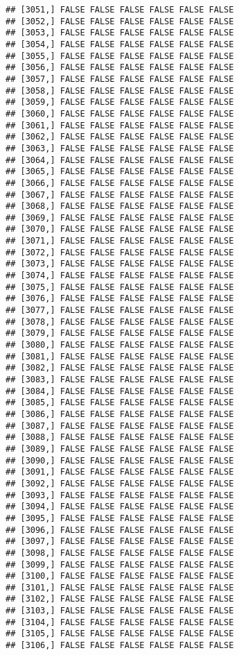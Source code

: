 \documentclass[
]{article}
\begin{document}
\begin{verbatim}
## [3051,] FALSE FALSE FALSE FALSE FALSE FALSE
## [3052,] FALSE FALSE FALSE FALSE FALSE FALSE
## [3053,] FALSE FALSE FALSE FALSE FALSE FALSE
## [3054,] FALSE FALSE FALSE FALSE FALSE FALSE
## [3055,] FALSE FALSE FALSE FALSE FALSE FALSE
## [3056,] FALSE FALSE FALSE FALSE FALSE FALSE
## [3057,] FALSE FALSE FALSE FALSE FALSE FALSE
## [3058,] FALSE FALSE FALSE FALSE FALSE FALSE
## [3059,] FALSE FALSE FALSE FALSE FALSE FALSE
## [3060,] FALSE FALSE FALSE FALSE FALSE FALSE
## [3061,] FALSE FALSE FALSE FALSE FALSE FALSE
## [3062,] FALSE FALSE FALSE FALSE FALSE FALSE
## [3063,] FALSE FALSE FALSE FALSE FALSE FALSE
## [3064,] FALSE FALSE FALSE FALSE FALSE FALSE
## [3065,] FALSE FALSE FALSE FALSE FALSE FALSE
## [3066,] FALSE FALSE FALSE FALSE FALSE FALSE
## [3067,] FALSE FALSE FALSE FALSE FALSE FALSE
## [3068,] FALSE FALSE FALSE FALSE FALSE FALSE
## [3069,] FALSE FALSE FALSE FALSE FALSE FALSE
## [3070,] FALSE FALSE FALSE FALSE FALSE FALSE
## [3071,] FALSE FALSE FALSE FALSE FALSE FALSE
## [3072,] FALSE FALSE FALSE FALSE FALSE FALSE
## [3073,] FALSE FALSE FALSE FALSE FALSE FALSE
## [3074,] FALSE FALSE FALSE FALSE FALSE FALSE
## [3075,] FALSE FALSE FALSE FALSE FALSE FALSE
## [3076,] FALSE FALSE FALSE FALSE FALSE FALSE
## [3077,] FALSE FALSE FALSE FALSE FALSE FALSE
## [3078,] FALSE FALSE FALSE FALSE FALSE FALSE
## [3079,] FALSE FALSE FALSE FALSE FALSE FALSE
## [3080,] FALSE FALSE FALSE FALSE FALSE FALSE
## [3081,] FALSE FALSE FALSE FALSE FALSE FALSE
## [3082,] FALSE FALSE FALSE FALSE FALSE FALSE
## [3083,] FALSE FALSE FALSE FALSE FALSE FALSE
## [3084,] FALSE FALSE FALSE FALSE FALSE FALSE
## [3085,] FALSE FALSE FALSE FALSE FALSE FALSE
## [3086,] FALSE FALSE FALSE FALSE FALSE FALSE
## [3087,] FALSE FALSE FALSE FALSE FALSE FALSE
## [3088,] FALSE FALSE FALSE FALSE FALSE FALSE
## [3089,] FALSE FALSE FALSE FALSE FALSE FALSE
## [3090,] FALSE FALSE FALSE FALSE FALSE FALSE
## [3091,] FALSE FALSE FALSE FALSE FALSE FALSE
## [3092,] FALSE FALSE FALSE FALSE FALSE FALSE
## [3093,] FALSE FALSE FALSE FALSE FALSE FALSE
## [3094,] FALSE FALSE FALSE FALSE FALSE FALSE
## [3095,] FALSE FALSE FALSE FALSE FALSE FALSE
## [3096,] FALSE FALSE FALSE FALSE FALSE FALSE
## [3097,] FALSE FALSE FALSE FALSE FALSE FALSE
## [3098,] FALSE FALSE FALSE FALSE FALSE FALSE
## [3099,] FALSE FALSE FALSE FALSE FALSE FALSE
## [3100,] FALSE FALSE FALSE FALSE FALSE FALSE
## [3101,] FALSE FALSE FALSE FALSE FALSE FALSE
## [3102,] FALSE FALSE FALSE FALSE FALSE FALSE
## [3103,] FALSE FALSE FALSE FALSE FALSE FALSE
## [3104,] FALSE FALSE FALSE FALSE FALSE FALSE
## [3105,] FALSE FALSE FALSE FALSE FALSE FALSE
## [3106,] FALSE FALSE FALSE FALSE FALSE FALSE

\end{verbatim}
\end{document}
